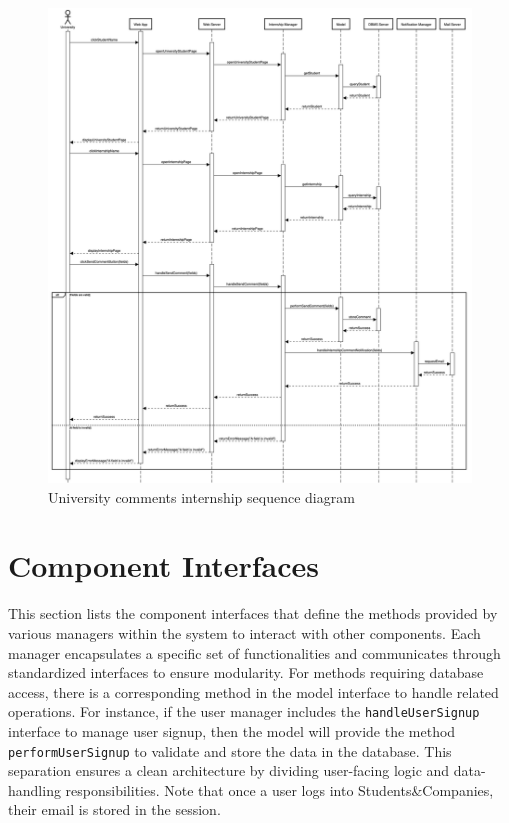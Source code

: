 \begin{figure}[h!] 
    \centering
    \includegraphics[width=16cm]{images/sequence-diagrams/university-comments-internship.png}
    \caption{University comments internship sequence diagram}
\end{figure}

\newpage
\section{Component Interfaces}
This section lists the component interfaces that define the methods provided by various managers within the system to interact with other components.
Each manager encapsulates a specific set of functionalities and communicates through standardized interfaces to ensure modularity.
For methods requiring database access, there is a corresponding method in the model interface to handle related operations. 
For instance, if the user manager includes the \texttt{handleUserSignup} interface to manage user signup, then the model will provide the method \texttt{performUserSignup} to validate and store the data in the database.
This separation ensures a clean architecture by dividing user-facing logic and data-handling responsibilities. 
Note that once a user logs into Students\&Companies, their email is stored in the session.


